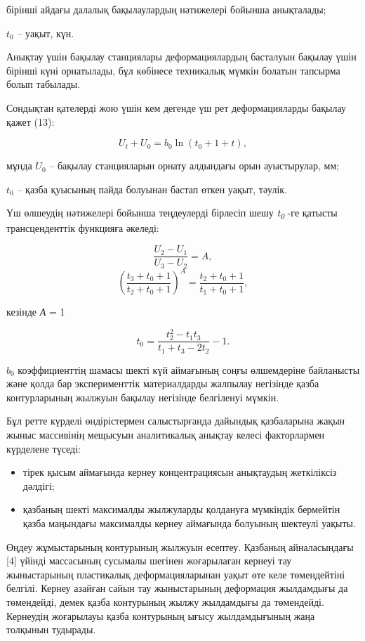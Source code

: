\begin{multicols}{2}
бірінші айдағы далалық бақылаулардың нәтижелері бойынша анықталады;

\(t_{0}\) -- уақыт, күн.

Анықтау үшін бақылау станциялары деформациялардың басталуын бақылау үшін
бірінші күні орнатылады, бұл көбінесе техникалық мүмкін болатын тапсырма
болып табылады.

Сондықтан қателерді жою үшін кем дегенде үш рет деформацияларды бақылау
қажет (13):

\begin{equation}
U_{t} + U_{0} = b_{0}\ln(t_{0} + 1 + t),
\end{equation}

мұнда \(U_{0}\) -- бақылау станцияларын орнату алдындағы орын
ауыстырулар, мм;

\(t_{0}\) -- қазба қуысының пайда болуынан бастап өткен уақыт, тәулік.

Үш өлшеудің нәтижелері бойынша теңдеулерді бірлесіп шешу
\emph{t\textsubscript{0 }}-ге қатысты трансценденттік функцияға әкеледі:

\[\frac{U_{2} - U_{1}}{U_{3} - U_{2}} = A,\]
\[\left( \frac{t_{3} + t_{0} + 1}{t_{2} + t_{0} + 1} \right)^{A} = \frac{t_{2} + t_{0} + 1}{t_{1} + t_{0} + 1},\]

кезінде \emph{А} = 1

\begin{equation}
t_{0} = \frac{t_{2}^{2} - t_{1}t_{3}}{t_{1} + t_{3} - 2t_{2}} - 1.
\end{equation}

\(b_{0}\) коэффициенттің шамасы шекті күй аймағының соңғы өлшемдеріне
байланысты және қолда бар эксперименттік материалдарды жалпылау
негізінде қазба контурларының жылжуын бақылау негізінде белгіленуі
мүмкін.

Бұл ретте күрделі өндірістермен салыстырғанда дайындық қазбаларына жақын
жыныс массивінің мещысуын аналитикалық анықтау келесі факторлармен
күрделене түседі:

\begin{itemize}
\item
  тірек қысым аймағында кернеу концентрациясын анықтаудың жеткіліксіз
  дәлдігі;
\item
  қазбаның шекті максималды жылжуларды қолдануға мүмкіндік бермейтін
  қазба маңындағы максималды кернеу аймағында болуының шектеулі уақыты.
\end{itemize}

Өңдеу жұмыстарының контурының жылжуын есептеу. Қазбаның айналасындағы
{[}4{]} үйінді массасының сусымалы шегінен жоғарылаған кернеуі тау
жыныстарының пластикалық деформацияларынан уақыт өте келе төмендейтіні
белгілі. Кернеу азайған сайын тау жыныстарының деформация жылдамдығы да
төмендейді, демек қазба контурының жылжу жылдамдығы да төмендейді.
Кернеудің жоғарылауы қазба контурының ығысу жылдамдығының жаңа толқынын
тудырады.


\end{multicols}
